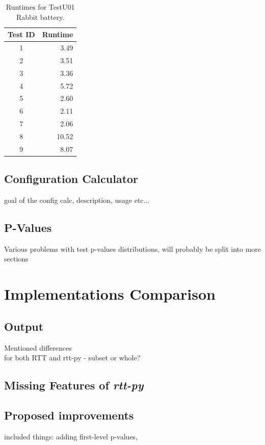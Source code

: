 \documentclass[
  digital,     %
  oneside,     %
  nosansbold,  %
  nocolorbold, %
  nolof,         %
  nolot,         %
]{fithesis4}
\begin{document}
\begin{table}[h]
  \begin{tabularx}{0.3\textwidth}{c|r}
  Test ID & Runtime \\
  \midrule
    1 & 3.49 \\
    2 & 3.51 \\
    3 & 3.36 \\
    4 & 5.72 \\
    5 & 2.60 \\
    6 & 2.11 \\
    7 & 2.06 \\
    8 & 10.52 \\
    9 & 8.07 \\
  \end{tabularx}
  \caption{Runtimes for TestU01 Rabbit battery.}
  \label{tab:analysis_alphabit_time}
\end{table}


\section{Configuration Calculator}
goal of the config calc, description, usage etc...
\section{P-Values}
Various problems with test p-values distributions, will probably be split into more sections


\chapter{Implementations Comparison}

\section{Output}
Mentioned differences\\
for both RTT and rtt-py - subset or whole?

\section{Missing Features of \emph{rtt-py}}

\section{Proposed improvements}
included things: adding first-level p-values, 
\end{document}
